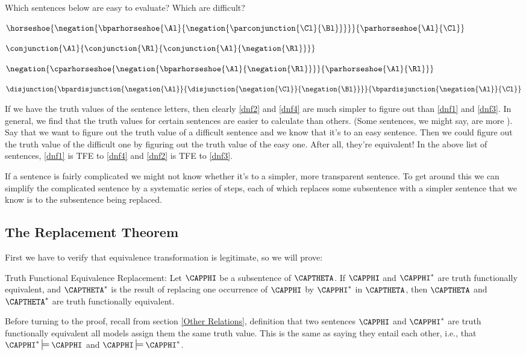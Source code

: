 Which sentences below are easy to evaluate? 
Which are difficult?
\begin{multicols}{2}
\begin{menumerate}
\item\label{dnf1} $\horseshoe{\negation{\bparhorseshoe{\Al}{\negation{\parconjunction{\Cl}{\Bl}}}}}{\parhorseshoe{\Al}{\Cl}}$
\item\label{dnf2} $\conjunction{\Al}{\conjunction{\Rl}{\conjunction{\Al}{\negation{\Rl}}}}$
\item\label{dnf3} $\negation{\cparhorseshoe{\negation{\bparhorseshoe{\Al}{\negation{\Rl}}}}{\parhorseshoe{\Al}{\Rl}}}$
\item\label{dnf4} $\disjunction{\bpardisjunction{\negation{\Al}}{\disjunction{\negation{\Cl}}{\negation{\Bl}}}}{\bpardisjunction{\negation{\Al}}{\Cl}}$
\end{menumerate}
\end{multicols}
\noindent{}If we have the truth values of the sentence letters, then clearly \ref{dnf2} and \ref{dnf4} are much simpler to figure out than \ref{dnf1} and \ref{dnf3}. 
In general, we find that the truth values for certain sentences are easier to calculate than others. (Some sentences, we might say, are more ). 
Say that we want to figure out the truth value of a difficult sentence and we know that it's  to an easy sentence. Then we could figure out the truth value of the difficult one by figuring out the truth value of the easy one.  After all, they're equivalent!  In the above list of sentences, \ref{dnf1} is TFE to \ref{dnf4} and \ref{dnf2} is TFE to \ref{dnf3}.

If a sentence is fairly complicated we might not know whether it's  to a simpler, more transparent sentence. 
To get around this we can simplify the complicated sentence by a systematic series of steps, each of which replaces some subsentence with a simpler sentence that we know is  to the subsentence being replaced.  

\subsection{The  Replacement Theorem}\label{The TFE Replacement Theorem}
First we have to verify that equivalence transformation is legitimate, so we will prove:
\begin{THEOREM}{ Truth Functional Equivalence Replacement:}
Let $\CAPPHI$ be a subsentence of $\CAPTHETA$.  If $\CAPPHI$ and $\CAPPHI^*$ are truth functionally equivalent, and $\CAPTHETA^*$ is the result of replacing one occurrence of $\CAPPHI$ by $\CAPPHI^*$ in $\CAPTHETA$, then $\CAPTHETA$ and $\CAPTHETA^*$ are truth functionally equivalent.
\end{THEOREM}
\noindent{}Before turning to the proof, recall from section \ref{Other Relations}, definition  that two sentences $\CAPPHI$ and $\CAPPHI^*$ are truth functionally equivalent \Iff all models assign them the same truth value.  This is the same as saying they entail each other, i.e., that $\CAPPHI^*\sdtstile{}{}\CAPPHI$ and $\CAPPHI\sdtstile{}{}\CAPPHI^*$. 

